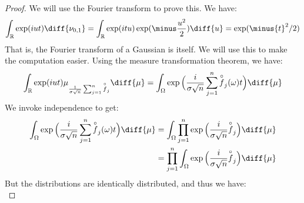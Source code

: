                 \begin{proof}
                    We will use the Fourier transform to prove this.
                    We have:
                    \begin{equation}
                        \int_{\mathbb{R}}\exp(iut)
                            \diff{\nu_{0,1}}=
                        \int_{\mathbb{R}}\exp(itu)
                            \exp(\minus\frac{u^{2}}{2})\diff{u}
                            =\exp(\minus{t}^{2}/2)
                    \end{equation}
                    That is, the Fourier transform of a Gaussian
                    is itself. We will use this to make the
                    computation easier. Using the measure
                    transformation theorem, we have:
                    \begin{equation}
                        \int_{\mathbb{R}}\exp(iut)
                        \mu_{\frac{1}{\sigma\sqrt{n}}
                            \sum_{j=1}^{n}\overset{\circ}{f}_{j}}
                            \diff{\mu}
                        =\int_{\Omega}\exp\Big(
                            \frac{i}{\sigma\sqrt{n}}\sum_{j=1}^{n}
                            \overset{\circ}{f}_{j}(\omega)t\Big)
                            \diff{\mu}
                    \end{equation}
                    We invoke independence to get:
                    \begin{subequations}
                        \begin{align}
                            \int_{\Omega}\exp\Big(
                                \frac{i}{\sigma\sqrt{n}}\sum_{j=1}^{n}
                                \overset{\circ}{f}_{j}(\omega)t\Big)
                                \diff{\mu}
                            &=\int_{\Omega}\prod_{j=1}^{n}
                                \exp\Big(\frac{i}{\sigma\sqrt{n}}
                                \overset{\circ}{f}_{j}\Big)\diff{\mu}\\
                            &=\prod_{j=1}^{n}\int_{\Omega}
                                \exp\Big(\frac{i}{\sigma\sqrt{n}}
                                \overset{\circ}{f}_{j}\Big)\diff{\mu}
                        \end{align}
                    \end{subequations}
                    But the distributions are identically distributed,
                    and thus we have:
                    \begin{equation}

\end{equation}
\end{proof}
